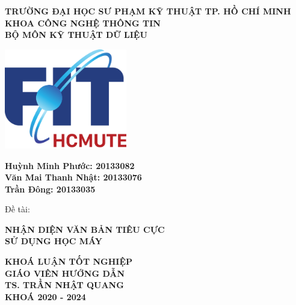 \thispagestyle{empty}
\begin{center}
    \fontsize{14pt}{21pt}
    \textbf{TRƯỜNG ĐẠI HỌC SƯ PHẠM KỸ THUẬT TP. HỒ CHÍ MINH}\\
    \textbf{KHOA CÔNG NGHỆ THÔNG TIN}\\
    \textbf{BỘ MÔN KỸ THUẬT DỮ LIỆU}\\
\end{center}

\vspace{0.5cm}
\begin{center}
    \includegraphics[width=0.4\textwidth]{prelims/image/logo-cntt2021.png}
\end{center}
\vspace{0.5cm}

\begin{center}
    \fontsize{14pt}{21pt}
    \textbf{Huỳnh Minh Phước: 20133082}\\
    \textbf{Văn Mai Thanh Nhật: 20133076}\\
    \textbf{Trần Đông: 20133035}\\
    \begin{minipage}{0.8\textwidth}
        \fontsize{14pt}{21pt}
        Đề tài:
    \end{minipage}
\end{center}
\begin{center}
    \fontsize{20pt}{30pt}
    \textbf{NHẬN DIỆN VĂN BẢN TIÊU CỰC\\ SỬ DỤNG HỌC MÁY}\\
\end{center}
\vspace{0.3cm}
\begin{center}
    \fontsize{14pt}{21pt}
    \textbf{KHOÁ LUẬN TỐT NGHIỆP}\\
    \vspace{1CM}
    \textbf{GIÁO VIÊN HƯỚNG DẪN}\\
    \textbf{TS. TRẦN NHẬT QUANG}\\
    \vfill
    \textbf{KHOÁ 2020 - 2024}
\end{center}
\restoregeometry
